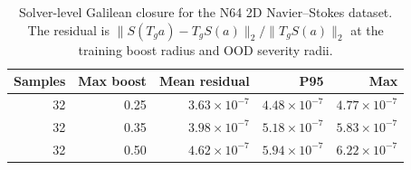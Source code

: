 \begin{table}[t]
\centering
\small
\caption{Solver-level Galilean closure for the N64 2D Navier--Stokes dataset. The residual is $\|S(T_g a)-T_gS(a)\|_2/\|T_gS(a)\|_2$ at the training boost radius and OOD severity radii.}
\label{tab:n64-solver-closure}
\begin{tabular}{rrrrr}
\toprule
Samples & Max boost & Mean residual & P95 & Max \\
\midrule
32 & 0.25 & \(3.63\times10^{-7}\) & \(4.48\times10^{-7}\) & \(4.77\times10^{-7}\) \\
32 & 0.35 & \(3.98\times10^{-7}\) & \(5.18\times10^{-7}\) & \(5.83\times10^{-7}\) \\
32 & 0.50 & \(4.62\times10^{-7}\) & \(5.94\times10^{-7}\) & \(6.22\times10^{-7}\) \\
\bottomrule
\end{tabular}
\end{table}
